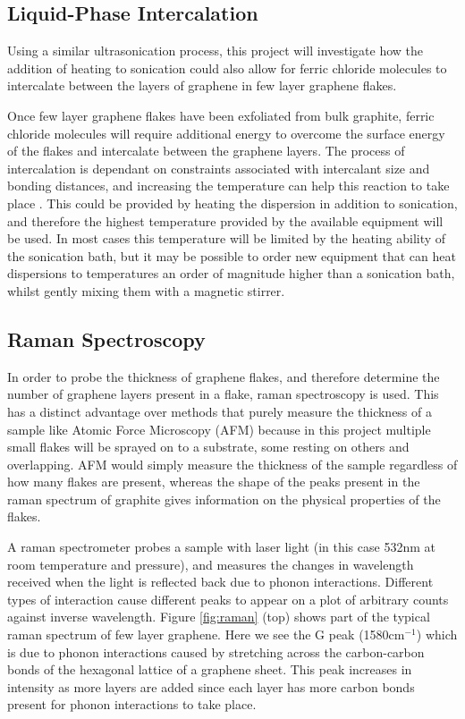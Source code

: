 \documentclass[12pt,titlepage]{article}
\begin{document}
	\subsection{Liquid-Phase Intercalation}
	Using a similar ultrasonication process, this project will investigate how the addition of heating to sonication could also allow for ferric chloride molecules to intercalate between the layers of graphene in few layer graphene flakes.
	
	Once few layer graphene flakes have been exfoliated from bulk graphite, ferric chloride molecules will require additional energy to overcome the surface energy of the flakes and intercalate between the graphene layers. The process of intercalation is dependant on constraints associated with intercalant size and bonding distances, and increasing the temperature can help this reaction to take place \cite{Khrapach2012a}. This could be provided by heating the dispersion in addition to sonication, and therefore the highest temperature provided by the available equipment will be used. In most cases this temperature will be limited by the heating ability of the sonication bath, but it may be possible to order new equipment that can heat dispersions to temperatures an order of magnitude higher than a sonication bath, whilst gently mixing them with a magnetic stirrer.
	
	\subsection{Raman Spectroscopy}
	In order to probe the thickness of graphene flakes, and therefore determine the number of graphene layers present in a flake, raman spectroscopy is used. This has a distinct advantage over methods that purely measure the thickness of a sample like Atomic Force Microscopy (AFM) because in this project multiple small flakes will be sprayed on to a substrate, some resting on others and overlapping. AFM would simply measure the thickness of the sample regardless of how many flakes are present, whereas the shape of the peaks present in the raman spectrum of graphite gives information on the physical properties of the flakes.
	
	A raman spectrometer probes a sample with laser light (in this case 532nm at room temperature and pressure), and measures the changes in wavelength received when the light is reflected back due to phonon interactions. Different types of interaction cause different peaks to appear on a plot of arbitrary counts against inverse wavelength. Figure \ref{fig:raman} (top) shows part of the typical raman spectrum of few layer graphene. Here we see the G peak (1580cm$^{-1}$) which is due to phonon interactions caused by stretching across the carbon-carbon bonds of the hexagonal lattice of a graphene sheet. This peak increases in intensity as more layers are added since each layer has more carbon bonds present for phonon interactions to take place. 
	
\end{document}
